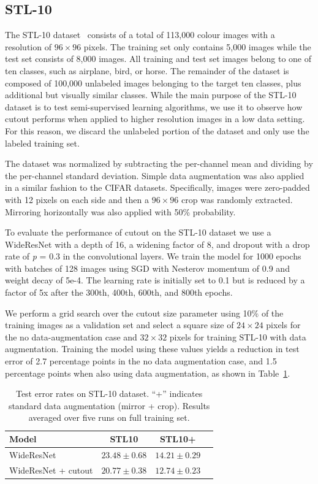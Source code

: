 \documentclass[10pt,twocolumn,letterpaper]{article}
\begin{document}
\subsection{STL-10}
The STL-10 dataset~\cite{coates2011analysis} consists of a total of 113,000 colour images with a resolution of $96 \times 96$ pixels. The training set only contains 5,000 images while the test set consists of 8,000 images. All training and test set images belong to one of ten classes, such as airplane, bird, or horse. The remainder of the dataset is composed of 100,000 unlabeled images belonging to the target ten classes, plus additional but visually similar classes. While the main purpose of the STL-10 dataset is to test semi-supervised learning algorithms, we use it to observe how cutout performs when applied to higher resolution images in a low data setting. For this reason, we discard the unlabeled portion of the dataset and only use the labeled training set.

The dataset was normalized by subtracting the per-channel mean and dividing by the per-channel standard deviation. Simple data augmentation was also applied in a similar fashion to the CIFAR datasets. Specifically, images were zero-padded with 12 pixels on each side and then a $96 \times 96$ crop was randomly extracted. Mirroring horizontally was also applied with 50\% probability.

To evaluate the performance of cutout on the STL-10 dataset we use a WideResNet with a depth of 16, a widening factor of 8, and dropout with a drop rate of \textit{p} = 0.3 in the convolutional layers. We train the model for 1000 epochs with batches of 128 images using SGD with Nesterov momentum of 0.9 and weight decay of 5e-4. The learning rate is initially set to 0.1 but is reduced by a factor of 5x after the 300th, 400th, 600th, and 800th epochs.

We perform a grid search over the cutout size parameter using 10\% of the training images as a validation set and select a square size of $24 \times 24$ pixels for the no data-augmentation case and $32 \times 32$ pixels for training STL-10 with data augmentation. Training the model using these values yields a reduction in test error of 2.7 percentage points in the no data augmentation case, and 1.5 percentage points when also using data augmentation, as shown in Table~\ref{table:stl10}.

\begin{table}[h]
\centering
\begin{tabular}{l|c|c c}
\hline
\textbf{Model}      & \textbf{STL10}             & \textbf{STL10+}             \\ \hline
WideResNet          & $23.48 \pm 0.68$          & $14.21 \pm 0.29$            \\
WideResNet + cutout & $\mathbf{20.77 \pm 0.38}$          & $\mathbf{12.74 \pm 0.23}$  \\ \hline %
\end{tabular}
\caption{Test error rates on STL-10 dataset. ``+'' indicates standard data augmentation (mirror + crop). Results averaged over five runs on full training set.}
\label{table:stl10}
\end{table}
\end{document}
